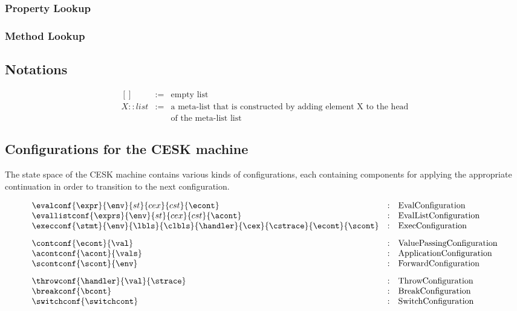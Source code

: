 \documentclass{article}
\begin{document}
\subsubsection{Property Lookup}
\label{subsubsec:property-lookup}

\subsubsection{Method Lookup}
\label{subsubsec:method-lookup}

\subsection{Notations}
\label{subsec:notations}

\[
  \begin{array}{lcl}
    [] &:=& \textrm{empty list}\\
    X :: list &:=& \textrm{a meta-list that is constructed by adding element X to the head}\\
    && \textrm{of the meta-list list}
  \end{array}
\]
\subsection{Configurations for the CESK machine}
\label{subsec:cesk-configs}
The state space of the CESK machine contains various kinds of configurations, each containing components for applying the appropriate continuation in order to transition to the next configuration. 

\[
  \begin{array}{lcl}
	\evalconf{\expr}{\env}{st}{cex}{cst}{\econt} & : &
	\textrm{EvalConfiguration}\\

	\evallistconf{\exprs}{\env}{st}{cex}{cst}{\acont} & : &
	\textrm{EvalListConfiguration}\\

	\execconf{\stmt}{\env}{\lbls}{\clbls}{\handler}{\cex}{\cstrace}{\econt}{\scont}  & : &
	\textrm{ExecConfiguration}\\[3mm]

	\contconf{\econt}{\val} & : &
	\textrm{ValuePassingConfiguration}\\

	\acontconf{\acont}{\vals} & : &
	\textrm{ApplicationConfiguration}\\

	\scontconf{\scont}{\env} & : &
	\textrm{ForwardConfiguration}\\[3mm]

	\throwconf{\handler}{\val}{\strace} & : &
	\textrm{ThrowConfiguration}\\

	\breakconf{\bcont} & : &
	\textrm{BreakConfiguration}\\

	\switchconf{\switchcont} & : &
	\textrm{SwitchConfiguration}\\

  \end{array}
\]
\end{document}
